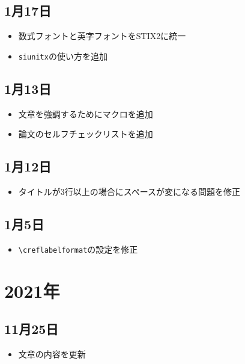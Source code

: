 \subsection*{1月17日}

\begin{itemize}
  \item 数式フォントと英字フォントをSTIX2に統一
  \item \texttt{siunitx}の使い方を追加
\end{itemize}

\subsection*{1月13日}

\begin{itemize}
  \item 文章を強調するためにマクロを追加
  \item 論文のセルフチェックリストを追加
\end{itemize}

\subsection*{1月12日}

\begin{itemize}
  \item タイトルが3行以上の場合にスペースが変になる問題を修正
\end{itemize}

\subsection*{1月5日}

\begin{itemize}
  \item \texttt{\textbackslash creflabelformat}の設定を修正
\end{itemize}

\section*{2021年}

\subsection*{11月25日}

\begin{itemize}
  \item 文章の内容を更新
\end{itemize}


